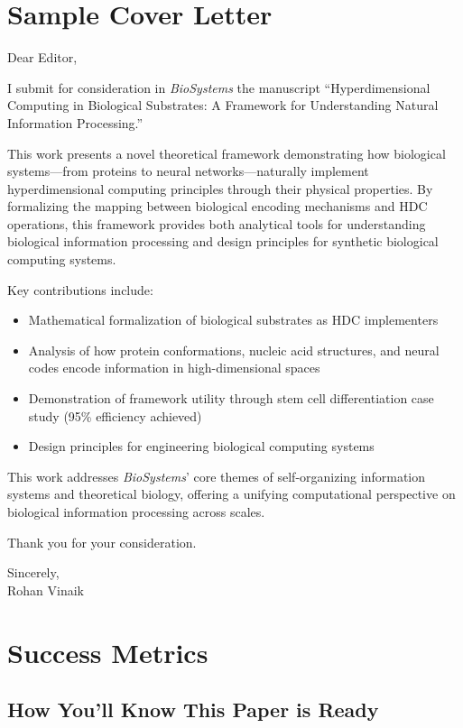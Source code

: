 \documentclass[11pt]{article}
\begin{document}
\section{Sample Cover Letter}

\begin{tcolorbox}[colback=blue!10,colframe=blue]
Dear Editor,

I submit for consideration in \textit{BioSystems} the manuscript ``Hyperdimensional Computing in Biological Substrates: A Framework for Understanding Natural Information Processing.''

This work presents a novel theoretical framework demonstrating how biological systems—from proteins to neural networks—naturally implement hyperdimensional computing principles through their physical properties. By formalizing the mapping between biological encoding mechanisms and HDC operations, this framework provides both analytical tools for understanding biological information processing and design principles for synthetic biological computing systems.

Key contributions include:
\begin{itemize}
    \item Mathematical formalization of biological substrates as HDC implementers
    \item Analysis of how protein conformations, nucleic acid structures, and neural codes encode information in high-dimensional spaces
    \item Demonstration of framework utility through stem cell differentiation case study (95\% efficiency achieved)
    \item Design principles for engineering biological computing systems
\end{itemize}

This work addresses \textit{BioSystems}' core themes of self-organizing information systems and theoretical biology, offering a unifying computational perspective on biological information processing across scales.

Thank you for your consideration.

Sincerely,\\
Rohan Vinaik
\end{tcolorbox}

\section{Success Metrics}

\subsection{How You'll Know This Paper is Ready}
\end{document}
